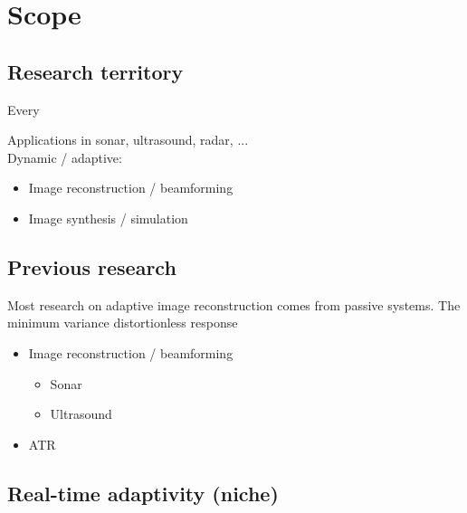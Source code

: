 {\section{Scope}



\subsection{Research territory}




Every 



Applications in sonar, ultrasound, radar, ...\\
Dynamic / adaptive:

\begin{itemize}
  \item Image reconstruction / beamforming
  \item Image synthesis / simulation
\end{itemize}

\subsection{Previous research}

Most research on adaptive image reconstruction comes from passive systems. The minimum variance distortionless response

\begin{itemize}
\item Image reconstruction / beamforming
  \begin{itemize}
  \item Sonar
  \item Ultrasound
  \end{itemize}
\item ATR
\end{itemize}


\subsection{Real-time adaptivity (niche)}

}
